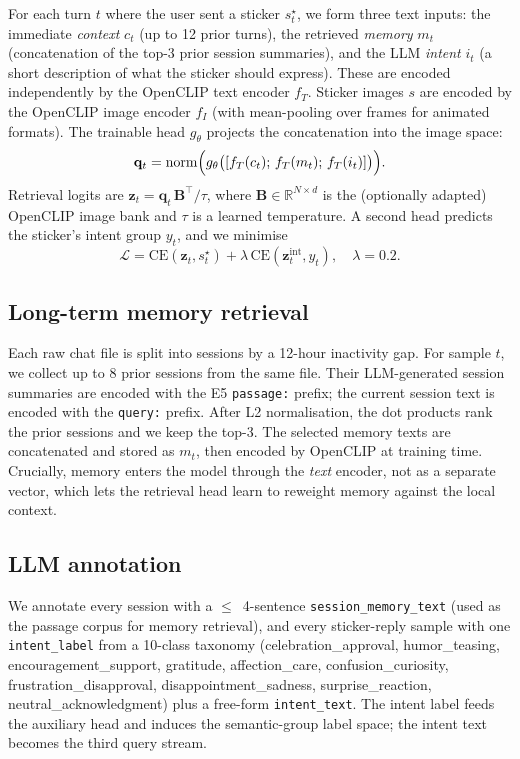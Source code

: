 \documentclass[10pt,twocolumn,letterpaper]{article}
\begin{document}
For each turn $t$ where the user sent a sticker $s^\star_t$, we form three
text inputs: the immediate \emph{context} $c_t$ (up to 12 prior turns),
the retrieved \emph{memory} $m_t$ (concatenation of the top-3 prior session
summaries), and the LLM \emph{intent} $i_t$ (a short description of what the
sticker should express). These are encoded independently by the OpenCLIP
text encoder $f_T$. Sticker images $s$ are encoded by the OpenCLIP image
encoder $f_I$ (with mean-pooling over frames for animated formats). The
trainable head $g_\theta$ projects the concatenation into the image space:
\begin{equation}
\mathbf{q}_t = \mathrm{norm}\Bigl(g_\theta\bigl(
  [f_T(c_t);\,f_T(m_t);\,f_T(i_t)]
\bigr)\Bigr).
\end{equation}
Retrieval logits are
$\mathbf{z}_t = \mathbf{q}_t\,\mathbf{B}^{\top}/\tau$,
where $\mathbf{B}\!\in\!\mathbb{R}^{N\times d}$ is the (optionally adapted)
OpenCLIP image bank and $\tau$ is a learned temperature. A second head
predicts the sticker's intent group $y_t$, and we minimise
\begin{equation}
\mathcal{L} = \mathrm{CE}(\mathbf{z}_t, s^\star_t) +
              \lambda \,\mathrm{CE}(\mathbf{z}^{\mathrm{int}}_t, y_t),
\quad \lambda{=}0.2.
\end{equation}

\subsection{Long-term memory retrieval}

Each raw chat file is split into sessions by a 12-hour inactivity gap. For
sample $t$, we collect up to 8 prior sessions from the same file. Their
LLM-generated session summaries are encoded with the E5 \texttt{passage:}
prefix; the current session text is encoded with the \texttt{query:} prefix.
After L2 normalisation, the dot products rank the prior sessions and we keep
the top-3. The selected memory texts are concatenated and stored as $m_t$,
then encoded by OpenCLIP at training time. Crucially, memory enters the model
through the \emph{text} encoder, not as a separate vector, which lets the
retrieval head learn to reweight memory against the local context.

\subsection{LLM annotation}

We annotate every session with a $\le$~4-sentence
\texttt{session\_memory\_text} (used as the passage corpus for memory
retrieval), and every sticker-reply sample with one
\texttt{intent\_label} from a 10-class taxonomy
(celebration\_approval, humor\_teasing, encouragement\_support, gratitude,
affection\_care, confusion\_curiosity, frustration\_disapproval,
disappointment\_sadness, surprise\_reaction, neutral\_acknowledgment) plus a
free-form \texttt{intent\_text}. The intent label feeds the auxiliary head
and induces the semantic-group label space; the intent text becomes the
third query stream.
\end{document}

